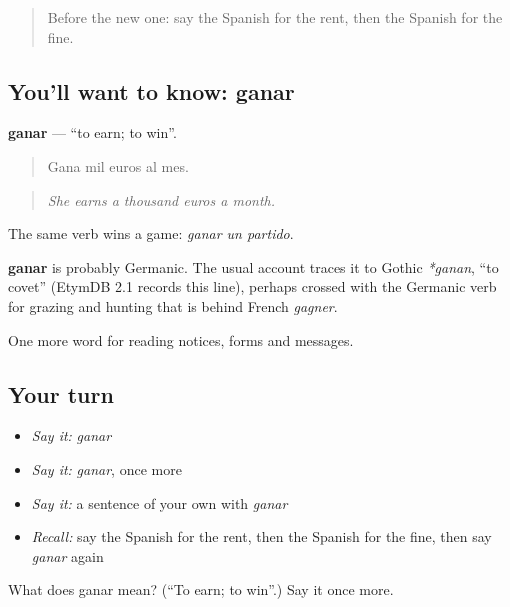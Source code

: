 \begin{quote}
Before the new one: say the Spanish for the rent, then the Spanish for the fine.
\end{quote}

\subsection*{You'll want to know: ganar}
\textbf{ganar} — \textquotedblleft{}to earn; to win\textquotedblright{}.

\begin{quote}
Gana mil euros al mes.
\end{quote}

\begin{quote}
\emph{She earns a thousand euros a month.}
\end{quote}

The same verb wins a game: \emph{ganar un partido}.

\begin{cousinweb}
\textbf{ganar} is probably Germanic. The usual account traces it to Gothic \emph{*ganan}, \textquotedblleft{}to covet\textquotedblright{} (EtymDB 2.1 records this line), perhaps crossed with the Germanic verb for grazing and hunting that is behind French \emph{gagner}.
\end{cousinweb}

\begin{grammarlens}[title={What you've built}]
One more word for reading notices, forms and messages.
\end{grammarlens}

\subsection*{Your turn}
\begin{itemize}
\raggedright
  \item \emph{Say it:} \emph{ganar}
  \item \emph{Say it:} \emph{ganar}, once more
  \item \emph{Say it:} a sentence of your own with \emph{ganar}
  \item \emph{Recall:} say the Spanish for the rent, then the Spanish for the fine, then say \emph{ganar} again
\end{itemize}

\begin{tcolorbox}[breakable,colback=teal!4,colframe=teal!35!black,title={Before you move on}]
What does ganar mean? (\textquotedblleft{}To earn; to win\textquotedblright{}.) Say it once more.
\end{tcolorbox}
